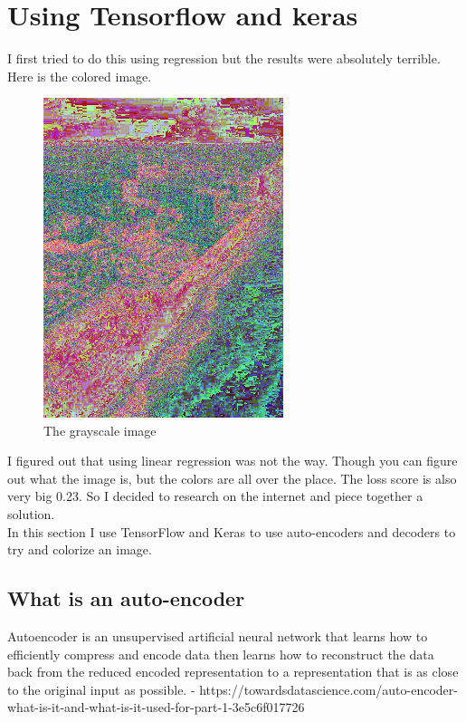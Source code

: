 \documentclass[12pt]{article} %
\begin{document}
\section{Using Tensorflow and keras}

I first tried to do this using regression but the results were absolutely terrible. Here is the colored image. 

\begin{figure}[H]
\centering
\includegraphics[width=70mm]{../pls.png}
\caption{The grayscale image \label{overflow}}
\end{figure}
I figured out that using linear regression was not the way. Though you can figure out what the image is, but the colors are all over the place. The loss score is also very big 0.23. So I decided to research on the internet and piece together a solution. 
\\

In this section I use TensorFlow and Keras to use auto-encoders and decoders to try and colorize an image. 

\subsection{What is an auto-encoder}
Autoencoder is an unsupervised artificial neural network that learns how to efficiently compress and encode data then learns how to reconstruct the data back from the reduced encoded representation to a representation that is as close to the original input as possible. - https://towardsdatascience.com/auto-encoder-what-is-it-and-what-is-it-used-for-part-1-3e5c6f017726 \\
\end{document}
